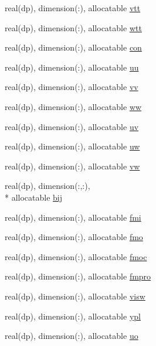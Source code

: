 \begin{DoxyCompactItemize}
\item 
real(dp), dimension(\-:), allocatable \hyperlink{classvariables_a446974075a477e4f4311dd2919bd1c3e}{vtt}
\item 
real(dp), dimension(\-:), allocatable \hyperlink{classvariables_a4f678b6d108e9e935a12868acd75d049}{wtt}
\item 
real(dp), dimension(\-:), allocatable \hyperlink{classvariables_a4c205afda65c592ecd9fe704fcabf938}{con}
\item 
real(dp), dimension(\-:), allocatable \hyperlink{classvariables_a2bed25657b0c478dee4913e79bcdb3a7}{uu}
\item 
real(dp), dimension(\-:), allocatable \hyperlink{classvariables_aef6fef20c791c27c3df889f2c9f02b3b}{vv}
\item 
real(dp), dimension(\-:), allocatable \hyperlink{classvariables_a4bda49dd30eadb3c0436d59272fb703f}{ww}
\item 
real(dp), dimension(\-:), allocatable \hyperlink{classvariables_a1be9ac67d728d322ffa4972e03977564}{uv}
\item 
real(dp), dimension(\-:), allocatable \hyperlink{classvariables_a5c939ce1a06535507aa593fc8afdd33e}{uw}
\item 
real(dp), dimension(\-:), allocatable \hyperlink{classvariables_a131da6ae59433fe4b51bb9a849f82f4c}{vw}
\item 
real(dp), dimension(\-:,\-:), \\*
allocatable \hyperlink{classvariables_a3ee0f04d3794cce2bc4b94acc2507775}{bij}
\item 
real(dp), dimension(\-:), allocatable \hyperlink{classvariables_a2e685aca274cbe74ce02b945c6210f0c}{fmi}
\item 
real(dp), dimension(\-:), allocatable \hyperlink{classvariables_a9ab32f17a2c20b8dd5d11af27d58584c}{fmo}
\item 
real(dp), dimension(\-:), allocatable \hyperlink{classvariables_a62667638543488cf69f047e3906bd3e8}{fmoc}
\item 
real(dp), dimension(\-:), allocatable \hyperlink{classvariables_a94a8c673d6ac8598e6c5f57b0bfc9366}{fmpro}
\item 
real(dp), dimension(\-:), allocatable \hyperlink{classvariables_a44c130feaa1e773ec5250ba9fd2fe354}{visw}
\item 
real(dp), dimension(\-:), allocatable \hyperlink{classvariables_aa28eada2885d956e6f235e13deeee5f3}{ypl}
\item 
real(dp), dimension(\-:), allocatable \hyperlink{classvariables_a70dd065a8048b0abfb87a173dc11fe31}{uo}

\end{DoxyCompactItemize}
